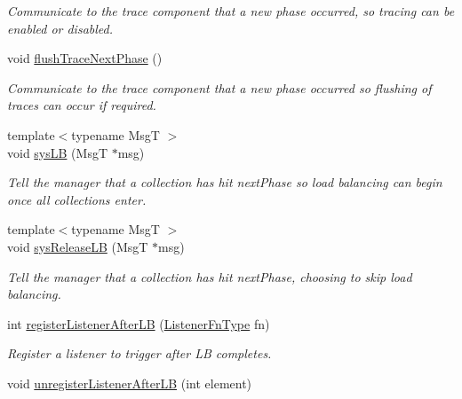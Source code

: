 \begin{DoxyCompactItemize}
\begin{DoxyCompactList}\small\item\em Communicate to the trace component that a new phase occurred, so tracing can be enabled or disabled. \end{DoxyCompactList}\item 
void \hyperlink{structvt_1_1vrt_1_1collection_1_1balance_1_1_l_b_manager_a5d22a62d49f296b4e77166667ed780d8}{flush\+Trace\+Next\+Phase} ()
\begin{DoxyCompactList}\small\item\em Communicate to the trace component that a new phase occurred so flushing of traces can occur if required. \end{DoxyCompactList}\item 
{\footnotesize template$<$typename MsgT $>$ }\\void \hyperlink{structvt_1_1vrt_1_1collection_1_1balance_1_1_l_b_manager_a5a3a3a1c74201981c2d62b85c2e84006}{sys\+LB} (MsgT $\ast$msg)
\begin{DoxyCompactList}\small\item\em Tell the manager that a collection has hit {\ttfamily next\+Phase} so load balancing can begin once all collections enter. \end{DoxyCompactList}\item 
{\footnotesize template$<$typename MsgT $>$ }\\void \hyperlink{structvt_1_1vrt_1_1collection_1_1balance_1_1_l_b_manager_a50a782417c408ce3c33e7d70ebcd5d2e}{sys\+Release\+LB} (MsgT $\ast$msg)
\begin{DoxyCompactList}\small\item\em Tell the manager that a collection has hit {\ttfamily next\+Phase}, choosing to skip load balancing. \end{DoxyCompactList}\item 
int \hyperlink{structvt_1_1vrt_1_1collection_1_1balance_1_1_l_b_manager_aa1766ec44d792acb5bae25162ce4c1de}{register\+Listener\+After\+LB} (\hyperlink{structvt_1_1vrt_1_1collection_1_1balance_1_1_l_b_manager_a1bb65b50c7cefb8c139a9f40a83ca18b}{Listener\+Fn\+Type} fn)
\begin{DoxyCompactList}\small\item\em Register a listener to trigger after LB completes. \end{DoxyCompactList}\item 
void \hyperlink{structvt_1_1vrt_1_1collection_1_1balance_1_1_l_b_manager_a3b60d748591ddfa5992eadbe7773fe47}{unregister\+Listener\+After\+LB} (int element)

\end{DoxyCompactItemize}
